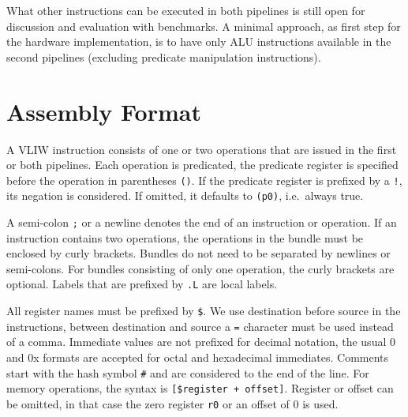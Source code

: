 \documentclass[a4paper,fontsize=10pt,twoside,DIV15,BCOR12mm,headinclude=true,footinclude=false,pagesize,bibtotoc]{scrbook}
\newcommand{\comment}[3]{

\textsf{\textbf{#1}} {\color{#3}#2}}
\newcommand{\martin}[1]{\comment{Martin}{#1}{Blue}}
\newcommand{\stefan}[1]{\comment{Stefan}{#1}{RoyalPurple}}
\renewcommand{\martin}[1]{}
\renewcommand{\stefan}[1]{}
\begin{document}
What other instructions can be executed in both pipelines is still open for
discussion and evaluation with benchmarks. A minimal approach, as first
step for the hardware implementation, is to have only ALU instructions
available in the second pipelines (excluding predicate manipulation instructions).

\stefan{From what I see in the code, it might also help a lot to allow SWS in the
second pipeline, as they are quite common. Predicate instructions are not that common
now but this will change with the new single-path passes.

This section should also talk about hazards, i.e., can we predicate the second
slot with something that we write in the first slot, what if we use a GP register
in both slots and write to it, ... }

\martin{TODO: agree that we/I should write more on this. Currently
Wolfgang has implemented ALU and predicate operations in both
pipelines. More details shall be described.}

\stefan{Is MFS/MTS allowed in both pipelines (and at the same time)? Should be helpful for prologue/epiloge code,
especially when we move return infos back to special registers.}


\section{Assembly Format}

\martin{This is not pasim, right?}

A VLIW instruction consists of one or two operations that are issued in the first or both pipelines.
Each operation is predicated, the predicate register is specified before the operation in parentheses \texttt{()}.
If the predicate register is prefixed by a \texttt{!}, its negation is considered.
If omitted, it defaults to \texttt{(p0)}, i.e.\ always true.

A semi-colon \texttt{;} or a newline denotes the end of an instruction or operation. If an instruction contains two operations, the operations
in the bundle must be enclosed by curly brackets. Bundles do not need to be separated by newlines or semi-colons. For bundles consisting of
only one operation, the curly brackets are optional. Labels that are prefixed by \texttt{.L} are local labels.

All register names must be prefixed by \texttt{\$}.
We use destination before source in the instructions, between destination and source a \texttt{=} character must be used instead of a comma.
Immediate values are not prefixed for decimal notation, the usual 0 and 0x formats are accepted for octal and hexadecimal immediates.
Comments start with the hash symbol \texttt{\#} and are considered to the end of the line. For memory operations, the syntax is
\texttt{[\$register + offset]}. Register or offset can be omitted, in that case the zero register \texttt{r0} or an offset of $0$ is used.
\end{document}
